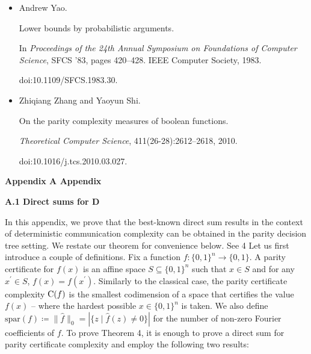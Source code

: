 \documentclass[10pt,a4paper]{article}
\begin{document}
\begin{itemize}
\item[] 
[56]

Andrew Yao.


Lower bounds by probabilistic arguments.


In \emph{Proceedings of the 24th Annual Symposium on Foundations of
Computer Science}, SFCS ’83, pages 420–428. IEEE Computer Society, 1983.


doi:10.1109/SFCS.1983.30.





\item[] 
[57]

Zhiqiang Zhang and Yaoyun Shi.


On the parity complexity measures of boolean functions.


\emph{Theoretical Computer Science}, 411(26-28):2612–2618, 2010.


doi:10.1016/j.tcs.2010.03.027.





\end{itemize}




\par\medskip\noindent\textbf{
Appendix A Appendix}\par




\par\medskip\noindent\textbf{
A.1 Direct sums for D
}\par




In this appendix, we prove that the best-known direct sum results in the context of deterministic communication complexity can be obtained in the parity decision tree setting. We restate our theorem for convenience below.
See 4
Let us first introduce a couple of definitions. Fix a function $f\colon\{0,1\}^{n}\to\{0,1\}$. A parity certificate for $f(x)$ is an affine space $S\subseteq\{0,1\}^{n}$ such that $x\in S$ and for any $x^{\prime}\in S$, $f(x)=f(x^{\prime})$. Similarly to the classical case, the parity certificate complexity ${\textup{C}}(f)$ is the smallest codimension of a space that certifies the value $f(x)$ – where the hardest possible $x\in\{0,1\}^{n}$ is taken. We also define $\mathrm{spar}(f)\coloneqq\|\hat{f}\|_{0}=|\{z\mid\hat{f}(z)\neq 0\}|$ for the number of non-zero Fourier coefficients of $f$. To prove Theorem 4, it is enough to prove a direct sum for parity certificate complexity and employ the following two results:\par
\end{document}
